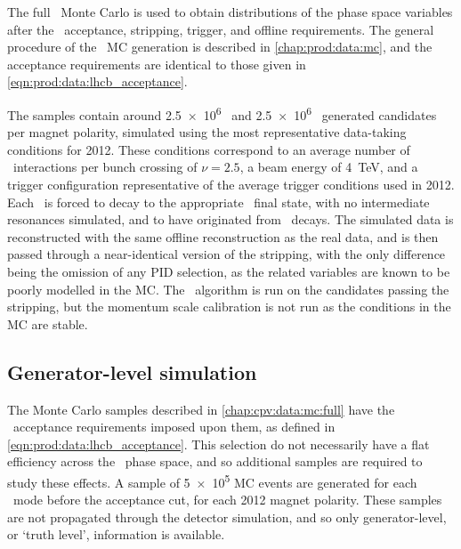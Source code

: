 The full \lhcb\ Monte Carlo is used to obtain distributions of the phase space 
variables after the \lhcb\ acceptance, stripping, trigger, and offline 
requirements.
The general procedure of the \lhcb\ \ac{MC} generation is described in 
\cref{chap:prod:data:mc}, and the acceptance requirements are identical to 
those given in \cref{eqn:prod:data:lhcb_acceptance}.

The samples contain around \num{2.5e6} \pKK\ and \num{2.5e6} \ppipi\ generated 
candidates per magnet polarity, simulated using the most representative 
data-taking conditions for 2012.
These conditions correspond to an average number of \pp\ interactions per bunch 
crossing of $\nu = 2.5$, a beam energy of \SI{4}{\TeV}, and a trigger 
configuration representative of the average trigger conditions used in 2012.
Each \PLambdac\ is forced to decay to the appropriate \phh\ final state, with 
no intermediate resonances simulated, and to have originated from \LbToLcmunu\ 
decays.
The simulated data is reconstructed with the same offline reconstruction as the 
real data, and is then passed through a near-identical version of the 
stripping, with the only difference being the omission of any \ac{PID} 
selection, as the related variables are known to be poorly modelled in the 
\ac{MC}.
The \decaytreefitter\ algorithm is run on the candidates passing the stripping, 
but the momentum scale calibration is not run as the conditions in the \ac{MC} 
are stable.

\subsection{Generator-level simulation}
\label{chap:cpv:data:mc:gen}

The Monte Carlo samples described in \cref{chap:cpv:data:mc:full} have the 
\lhcb\ acceptance requirements imposed upon them, as defined in 
\cref{eqn:prod:data:lhcb_acceptance}.
This selection do not necessarily have a flat efficiency across the \LcTophh\ 
phase space, and so additional samples are required to study these effects.
A sample of \num{5e5} \ac{MC} events are generated for each \LcTophh\ mode 
before the acceptance cut, for each 2012 magnet polarity.
These samples are not propagated through the detector simulation, and so only 
generator-level, or `truth level', information is available.

\begin{table}
  \centering
  \caption{%
    Integrated luminosity for each data sample used in the analysis.
  }
  \label{tab:cpv:data:luminosity}
  
\end{table}

